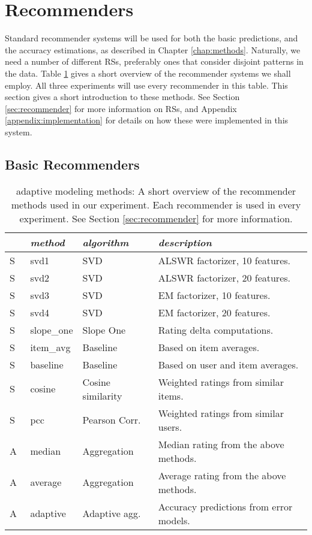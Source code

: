 \section{Recommenders}

Standard recommender systems will be used for both the basic predictions, and the accuracy estimations, as described in Chapter \ref{chap:methods}.
Naturally, we need a number of different RSs, preferably ones that consider
disjoint patterns in the data. Table \ref{table:results:methods}
gives a short overview of the recommender systems we shall employ.
All three experiments will use every recommender in this table.
This section gives a short introduction to these methods.
See Section \ref{sec:recommender} for more information on RSs, 
and Appendix \ref{appendix:implementation} for details on how these were implemented in this system.


\subsection{Basic Recommenders}

\begin{table}[t]
  \begin{tabular*}{\textwidth}{ l l l l }
    \toprule
    ~ & \emph{method} &  \emph{algorithm} & \emph{description} \\
    \midrule
    S & svd1          & SVD                   & ALSWR factorizer, 10 features. \\
    S & svd2          & SVD                   & ALSWR factorizer, 20 features. \\
    S & svd3          & SVD                   & EM factorizer, 10 features. \\
    S & svd4          & SVD                   & EM factorizer, 20 features. \\
    S & slope\_one    & Slope One             & Rating delta computations. \\
    S & item\_avg     & Baseline              & Based on item averages. \\ 
    S & baseline      & Baseline              & Based on user and item averages.\\ 
    S & cosine   	    & Cosine similarity     & Weighted ratings from similar items.\\ 
    S & pcc       	  & Pearson Corr.         & Weighted ratings from similar users.\\
    \midrule
    A & median    	  & Aggregation           & Median rating from the above methods. \\
    A & average    	  & Aggregation           & Average rating from the above methods. \\
    A & adaptive      & Adaptive agg.         & Accuracy predictions from error models. \\
    \bottomrule
  \end{tabular*}
  \caption[Adaptive Modeling Methods]{
    adaptive modeling methods: A short overview of the recommender methods
    used in our experiment.
    Each recommender is used in every experiment. 
    See Section \ref{sec:recommender} for more information.
  }
  \label{table:results:methods}
\end{table}

